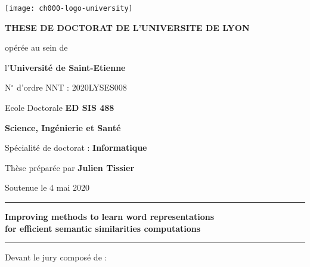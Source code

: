 \begin{titlepage}
\begin{center}
  \texttt{[image: ch000-logo-university]}

  \vspace{3em}
  {\Large \textbf{THESE DE DOCTORAT DE L’UNIVERSITE DE LYON}}

  \vspace{0.6em}
  opérée au sein de\par
  l'\textbf{Université de Saint-Etienne}\par
  \vspace{0.1em}
  {\small N$^\circ$ d’ordre NNT : 2020LYSES008}

  \vspace{1.6em}
  Ecole Doctorale \textbf{ED SIS 488} \par
  \textbf{Science, Ingénierie et Santé}

  \vspace{1.6em}
  Spécialité de doctorat : \textbf{Informatique}

  \vspace{1.6em}
  {\large Thèse préparée par \textbf{Julien Tissier} \par}
  \vspace{0.1em}
  {\large Soutenue le 4 mai 2020}

  \vspace{1em}

  \rule{\textwidth}{1pt}

  \vspace{0.8em}
  {\Large \textbf{Improving methods to learn word representations\\}}
  \vspace{0.6em}
  {\Large \textbf{for efficient semantic similarities computations}}
  \vspace{0.8em}

  \rule{\textwidth}{1pt}

  \vspace{2em}
  Devant le jury composé de :

  \begin{table}[h]
\end{table}
\end{center}
\end{titlepage}
